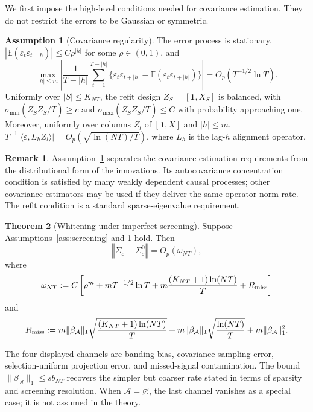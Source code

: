 ﻿\documentclass[12pt]{article}
\newcommand{\0}{\mbox{\bf 0}}
\theoremstyle{plain}%
\newtheorem{remark}{Remark}
\newtheorem{theorem}{Theorem}[section]
\theoremstyle{definition}
\newtheorem{theorem}{Theorem}[section]
\newtheorem{assumption}{Assumption}
\newtheorem{remark}[theorem]{Remark}
\begin{document}
{We first impose the high-level conditions needed for covariance estimation.
They do not restrict the errors to be Gaussian or symmetric.

\begin{assumption}[Covariance regularity]
\label{ass:stationary and weakly dependent}
The error process is stationary,
$|\mathbb E(\varepsilon_t\varepsilon_{t+h})|\le C\rho^{|h|}$ for some
$\rho\in(0,1)$, and
\[
\max_{|h|\le m}\left|
\frac1{T-|h|}\sum_{t=1}^{T-|h|}
\{\varepsilon_t\varepsilon_{t+|h|}
-\mathbb E(\varepsilon_t\varepsilon_{t+|h|})\}
\right|=O_p(T^{-1/2}\ln T).
\]
Uniformly over $|S|\le K_{NT}$, the refit design
$Z_S=[\mathbf 1,X_S]$ is balanced, with
$\sigma_{\min}(Z_S^\prime Z_S/T)\ge c$ and
$\sigma_{\max}(Z_S^\prime Z_S/T)\le C$
with probability approaching one.
Moreover, uniformly over columns $Z_l$ of $[\mathbf 1,X]$ and $|h|\le m$,
$T^{-1}|\langle\varepsilon,L_hZ_l\rangle|
=O_p(\sqrt{\ln(NT)/T})$,
where $L_h$ is the lag-$h$ alignment operator.
\end{assumption}

\begin{remark}
Assumption~\ref{ass:stationary and weakly dependent} separates the
covariance-estimation requirements from the distributional form of the
innovations.  Its autocovariance concentration condition is satisfied by
many weakly dependent causal processes; other covariance estimators may be
used if they deliver the same operator-norm rate.  The refit condition is a
standard sparse-eigenvalue requirement.
\end{remark}










\begin{theorem}[Whitening under imperfect screening]
\label{lm:Sigmahat} Suppose Assumptions~\ref{ass:screening} and
\ref{ass:stationary and weakly dependent} hold. Then
\[
\left\Vert \widehat{\Sigma}_{\varepsilon}
-\Sigma_{\varepsilon}^{0}\right\Vert=O_p(\omega_{NT}),
\]
where
\[
\omega_{NT}:=
C\left[
\rho^m+mT^{-1/2}\ln T+
m\frac{(K_{NT}+1)\ln(NT)}{T}+R_{\rm miss}
\right]
\]
and
\[
R_{\rm miss}:=
m\|\beta_{\mathcal A}\|_1
\sqrt{\frac{(K_{NT}+1)\ln(NT)}{T}}
+m\|\beta_{\mathcal A}\|_1
\sqrt{\frac{\ln(NT)}{T}}
+m\|\beta_{\mathcal A}\|_1^2 .
\]
\end{theorem}


The four displayed channels are banding bias, covariance sampling error,
selection-uniform projection error, and missed-signal contamination.  The
bound $\|\beta_{\mathcal A}\|_1\le s b_{NT}$ recovers the simpler but
coarser rate stated in terms of sparsity and screening resolution.  When
$\mathcal A=\varnothing$, the last channel vanishes as a special case; it
is not assumed in the theory.

}
\end{document}
